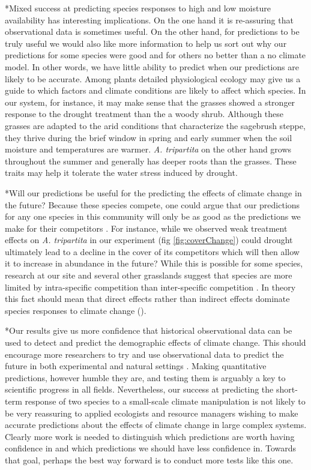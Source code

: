 \documentclass[11pt]{article}
\begin{document}
\begin{doublespacing}
*Mixed success at predicting species responses to high and low moisture availability has interesting implications.  On the one hand it is re-assuring that observational data is sometimes useful. On the other hand, for predictions to be truly useful we would also like more information to help us sort out why our predictions for some species were good and for others no better than a no climate model.  In other words, we have little ability to predict when our predictions are likely to be accurate.  Among plants detailed physiological ecology may give us a guide to which factors and climate conditions are likely to affect which species.  In our system, for instance, it may make sense that the grasses showed a stronger response to the drought treatment than the a woody shrub.  Although these grasses are adapted to the arid conditions that characterize the sagebrush steppe, they thrive during the brief window in spring and early summer when the soil moisture and temperatures are warmer.  \textit{A. tripartita} on the other hand grows throughout the summer and generally has deeper roots than the grasses. These traits may help it tolerate the water stress induced by drought. 

*Will our predictions be useful for the predicting the effects of climate change in the future? Because these species compete, one could argue that our predictions for any one species in this community will only be as good as the predictions we make for their competitors \citep{tylianakis}. For instance, while we observed weak treatment effects on \textit{A. tripartita} in our experiment (fig \ref{fig:coverChange}) could drought ultimately lead to a decline in the cover of its competitors which will then allow it to increase in abundance in the future?  While this is possible for some species, research at our site and several other grasslands suggest that species are more limited by intra-specific competition than inter-specific competition \cite{chu_direct_2016,adler_weak_2016}. In theory this fact should mean that direct effects rather than indirect effects dominate species responses to climate change (\citep{levine_competitors_2010,kleinhesselink_indirect_2015,adler_forecasting_2012}).  

*Our results give us more confidence that historical observational data can be used to detect and predict the demographic effects of climate change. This should encourage more researchers to try and use observational data to predict the future in both experimental and natural settings \citep{houlahan_priority_2016}. Making quantitative predictions, however humble they are, and testing them is arguably a key to scientific progress in all fields.  Nevertheless, our success at predicting the short-term response of two species to a small-scale climate manipulation is not likely to be very reassuring to applied ecologists and resource managers wishing to make accurate predictions about the effects of climate change in large complex systems.  Clearly more work is needed to distinguish which predictions are worth having confidence in and which predictions we should have less confidence in. Towards that goal, perhaps the best way forward is to conduct more tests like this one.   
  

\end{doublespacing}
\end{document}
